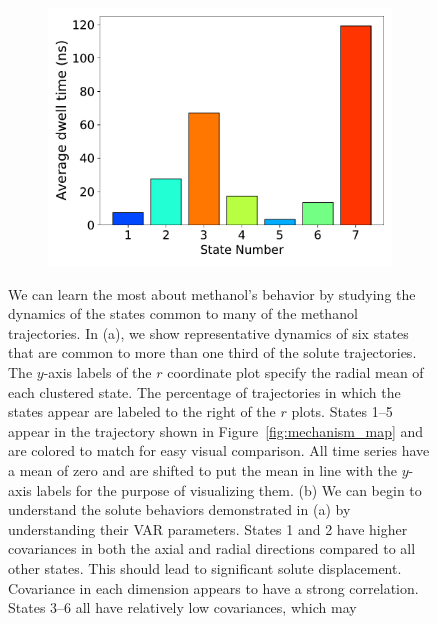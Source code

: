 \documentclass[journal=jpcbfk,manuscript=article]{achemso}
\begin{document}
\begin{figure}
\begin{subfigure}{0.35\textwidth}
  \caption{}\label{fig:A_sigma_scatter_MET}
  \includegraphics[width=\textwidth]{dwell_times_MET.pdf}  %
  \caption{}\label{fig:dwell_times_MET}
  \end{subfigure}
  \caption{We can learn the most about methanol's behavior by studying the dynamics
  of the states common to many of the methanol trajectories. In (a), we show representative
  dynamics of six states that are common to more than one third of the solute trajectories. 
  The $y$-axis labels of the $r$ coordinate plot specify the radial mean of each clustered 
  state. 
  The percentage of trajectories in which the states appear are labeled to the right of
  the $r$ plots. States 1--5 appear in the trajectory shown in Figure~\ref{fig:mechanism_map}
  and are colored to match for easy visual comparison. All time series have a mean of zero and are
  shifted to put the mean in line with the $y$-axis labels for the purpose of visualizing them. 
  (b) We can begin to understand the solute behaviors demonstrated in (a) by understanding their VAR 
  parameters. States 1 and 2 have higher covariances in both the axial and radial directions compared
  to all other states. This should lead to significant solute displacement. Covariance in each dimension
  appears to have a strong correlation. States 3--6 all have relatively low covariances, which may
}
\end{figure}
\end{document}
